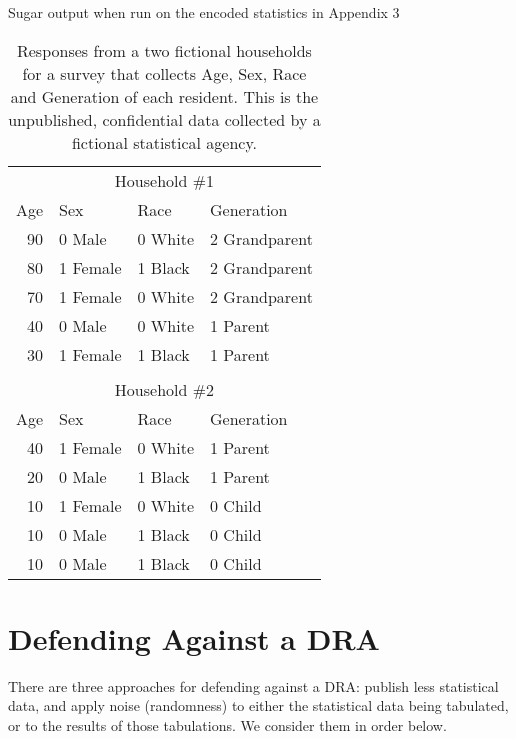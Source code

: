 \documentclass[runningheads]{llncs}
\begin{document}
\begin{table}
\begin{minipage}{.48\linewidth}

\caption{Sugar output when run on the encoded statistics in Appendix 3}\label{sugarbig}
\end{minipage}
\begin{minipage}[t]{.48\linewidth}
\begin{tabular}{rllp{1in}}
\hline
\multicolumn{4}{c}{Household \#1}   \\
Age & Sex & Race & Generation     \\
\hline
90  & 0 Male   & 0 White & 2 Grandparent   \\      
80  & 1 Female & 1 Black & 2 Grandparent \\    
70  & 1 Female & 0 White & 2 Grandparent \\  
40  & 0 Male   & 0 White & 1 Parent        \\
30  & 1 Female & 1 Black & 1 Parent      \\
\hline
\\
\multicolumn{4}{c}{Household \#2} \\
Age & Sex & Race & Generation     \\
\hline
40 & 1 Female & 0 White & 1 Parent      \\
20 & 0 Male   & 1 Black & 1 Parent        \\
10 & 1 Female & 0 White & 0 Child       \\
10 & 0 Male   & 1 Black & 0 Child         \\
10 & 0 Male   & 1 Black & 0 Child         \\
\hline
\end{tabular}
\caption{Responses from a two fictional households
for a survey that collects Age, Sex, Race and Generation of each resident. This is
the unpublished, confidential data collected by a fictional statistical
agency.}\label{responses}
\end{minipage}
\end{table}



\section{Defending Against a DRA}
There are three approaches for defending against a DRA: publish less
statistical data, and apply noise (randomness) to either the
statistical data being tabulated, or to the results of those
tabulations. We consider them in order below.
\end{document}
